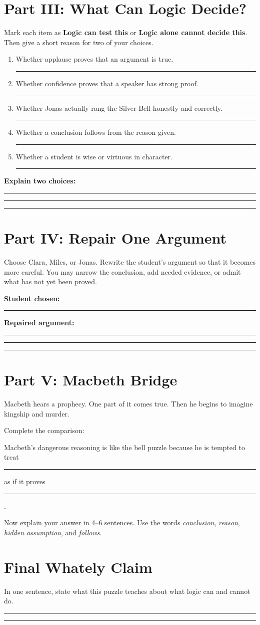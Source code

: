 \documentclass[12pt]{article}
\newcommand{\focusbox}[1]{\par\vspace{0.35em}\noindent\begingroup\setlength{\fboxsep}{6pt}\colorbox{gray!12}{\begin{minipage}{\dimexpr\linewidth-2\fboxsep\relax}#1\end{minipage}}\endgroup\par\vspace{0.45em}}
\newcommand{\studentline}{\par\vspace{0.64em}\hrule\vspace{0.68em}}
\begin{document}
\Needspace{0.42\textheight}
\section*{Part III: What Can Logic Decide?}
Mark each item as \textbf{Logic can test this} or \textbf{Logic alone cannot decide this}. Then give a short reason for two of your choices.

\begin{enumerate}[leftmargin=*]
\item Whether applause proves that an argument is true. \hfill \rule{2.3in}{0.4pt}
\item Whether confidence proves that a speaker has strong proof. \hfill \rule{2.3in}{0.4pt}
\item Whether Jonas actually rang the Silver Bell honestly and correctly. \hfill \rule{2.3in}{0.4pt}
\item Whether a conclusion follows from the reason given. \hfill \rule{2.3in}{0.4pt}
\item Whether a student is wise or virtuous in character. \hfill \rule{2.3in}{0.4pt}
\end{enumerate}

\textbf{Explain two choices:}\studentline\studentline\studentline

\Needspace{0.28\textheight}
\section*{Part IV: Repair One Argument}
Choose Clara, Miles, or Jonas. Rewrite the student's argument so that it becomes more careful. You may narrow the conclusion, add needed evidence, or admit what has not yet been proved.

\textbf{Student chosen:} \rule{1.45in}{0.4pt}

\textbf{Repaired argument:}\studentline\studentline\studentline

\Needspace{0.32\textheight}
\section*{Part V: Macbeth Bridge}
Macbeth hears a prophecy. One part of it comes true. Then he begins to imagine kingship and murder.

Complete the comparison:

\focusbox{Macbeth's dangerous reasoning is like the bell puzzle because he is tempted to treat \rule{1.8in}{0.4pt} as if it proves \rule{1.8in}{0.4pt}.}

Now explain your answer in 4--6 sentences. Use the words \textit{conclusion}, \textit{reason}, \textit{hidden assumption}, and \textit{follows}.

\vspace{1.55in}

\Needspace{0.18\textheight}
\section*{Final Whately Claim}
In one sentence, state what this puzzle teaches about what logic can and cannot do.

\studentline\studentline
\end{document}
